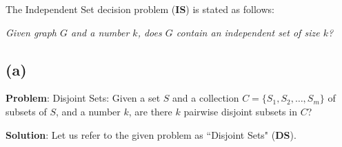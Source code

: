 \documentclass[11pt, fleqn]{article}
\begin{document}
\bigskip

The Independent Set decision problem (\textbf{IS}) is stated as follows:
\begin{center}
    \textit{Given graph $G$ and a number $k$, does $G$ contain an independent set of size $k$?}
\end{center}

\subsection*{(a)}

\textbf{Problem}: Disjoint Sets: Given a set $S$ and a collection $C = \{S_1,S_2,\dots,S_m\}$ of subsets of $S$, and a number $k$, are there $k$ pairwise disjoint subsets in $C$?

\bigskip

\textbf{Solution}: Let us refer to the given problem as ``Disjoint Sets" (\textbf{DS}).
\end{document}
